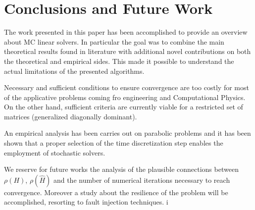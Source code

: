\section{Conclusions and Future Work}

The work presented in this paper has been accomplished to provide an overview
about MC linear solvers. In particular the goal was to combine the main
theoretical results found in literature with additional novel contributions on
both the theoretical and empirical sides. This made it possible to understand
the actual limitations of the presented algorithms.

Necessary and sufficient conditions to ensure convergence are too costly for
most of the applicative problems coming fro engineering and Computational
Physics. On the other hand, sufficient criteria are currently viable for a
restricted set of matrices (generalized diagonally dominant).

An empirical analysis has been carries out on parabolic problems and it has
been shown that a proper selection of the time discretization step enables the
employment of stochastic solvers.

We reserve for future works the analysis of the plausible connections between
$\rho(H)$, $\rho(\hat{H})$ and the number of numerical iterations necessary to
reach convergence. Moreover a study about the resilience of the problem will be
accomplished, resorting to fault injection techniques.
i
